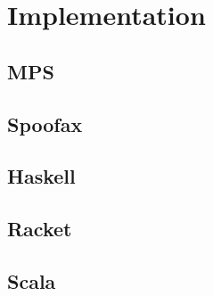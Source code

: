 \chapter{Implementation}

\section{MPS}



\section{Spoofax}

\section{Haskell}

\section{Racket}

\section{Scala}
